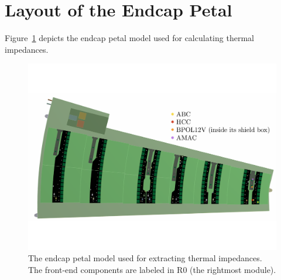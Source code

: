 
\section{Layout of the Endcap Petal}

Figure~\ref{endcap_model} depicts the endcap petal model used for calculating thermal impedances.

\begin{figure}[ht!]
\begin{center}
\includegraphics[width=0.99\linewidth]{figures/m30C_0Wm2C_Setup_BPOL12V.pdf}
\end{center}
\caption{The endcap petal model used for extracting thermal impedances. The front-end components are
labeled in R0 (the rightmost module).}
\label{endcap_model}
\end{figure}

